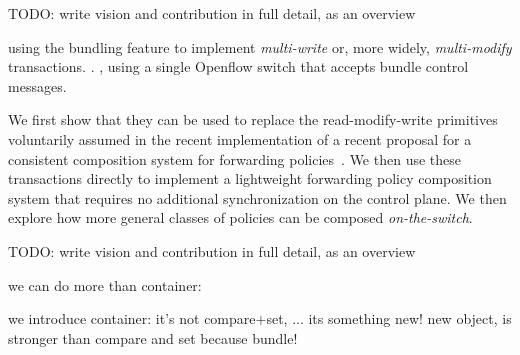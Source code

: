 \documentclass[conference]{sigcomm-alternate}
\begin{document}
\begin{appendix}
TODO: write vision and contribution in full detail, as an overview


using the bundling feature to implement \emph{multi-write} or, more
widely, \emph{multi-modify} transactions. .
, using a single Openflow switch that accepts
bundle control messages.

We first show that they can be used to replace the read-modify-write
primitives voluntarily assumed in the recent implementation of a
recent proposal for a consistent composition system for forwarding policies~\cite{cpc}.
We then use these transactions directly to implement a lightweight
forwarding policy composition system that requires no additional
synchronization on the control plane.
We then explore how more general classes of policies can be composed
\emph{on-the-switch}.

TODO: write vision and contribution in full detail, as an overview

we can do more than container:

we introduce container: it's not compare+set, ... its something new!
new object, is stronger than compare and set because bundle!


\end{appendix}
\end{document}
